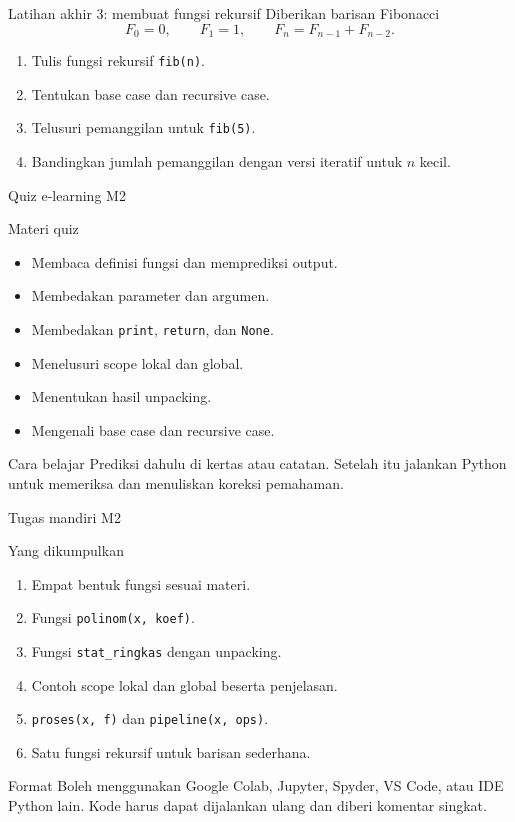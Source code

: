 \documentclass[aspectratio=169,11pt]{beamer}
\begin{document}
\begin{frame}[fragile]{Latihan akhir 3: membuat fungsi rekursif}
Diberikan barisan Fibonacci
\[
F_0=0,\qquad F_1=1,\qquad F_n=F_{n-1}+F_{n-2}.
\]
\begin{enumerate}
  \item Tulis fungsi rekursif \texttt{fib(n)}.
  \item Tentukan base case dan recursive case.
  \item Telusuri pemanggilan untuk \texttt{fib(5)}.
  \item Bandingkan jumlah pemanggilan dengan versi iteratif untuk $n$ kecil.
\end{enumerate}
\end{frame}

\begin{frame}{Quiz e-learning M2}
\begin{block}{Materi quiz}
\begin{itemize}
  \item Membaca definisi fungsi dan memprediksi output.
  \item Membedakan parameter dan argumen.
  \item Membedakan \texttt{print}, \texttt{return}, dan \texttt{None}.
  \item Menelusuri scope lokal dan global.
  \item Menentukan hasil unpacking.
  \item Mengenali base case dan recursive case.
\end{itemize}
\end{block}
\begin{block}{Cara belajar}
Prediksi dahulu di kertas atau catatan. Setelah itu jalankan Python untuk memeriksa dan menuliskan koreksi pemahaman.
\end{block}
\end{frame}

\begin{frame}{Tugas mandiri M2}
\begin{block}{Yang dikumpulkan}
\begin{enumerate}
  \item Empat bentuk fungsi sesuai materi.
  \item Fungsi \texttt{polinom(x, koef)}.
  \item Fungsi \texttt{stat\_ringkas} dengan unpacking.
  \item Contoh scope lokal dan global beserta penjelasan.
  \item \texttt{proses(x, f)} dan \texttt{pipeline(x, ops)}.
  \item Satu fungsi rekursif untuk barisan sederhana.
\end{enumerate}
\end{block}
\begin{block}{Format}
Boleh menggunakan Google Colab, Jupyter, Spyder, VS Code, atau IDE Python lain. Kode harus dapat dijalankan ulang dan diberi komentar singkat.
\end{block}
\end{frame}
\end{document}
